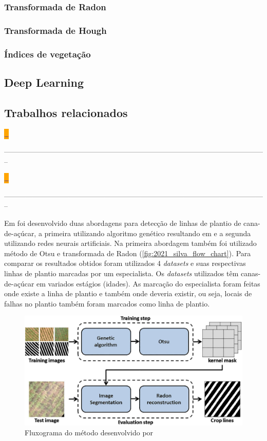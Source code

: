 \documentclass[12pt, a4paper, english, brazil]{article}
\newcommand{\dotsBlue}{\colorbox{orange}{\textcolor{blue}{\dots}}}
\newcommand{\linePage}{--------------------------------------------------------------------------------------------------------------}
\begin{document}
\subsubsection{Transformada de Radon}

\subsubsection{Transformada de Hough}

\subsubsection{Índices de vegetação}

\subsection{Deep Learning}

\subsection{Trabalhos relacionados}

\cite{Souza_2017} \dotsBlue

\linePage

\cite{Souza_2018} \dotsBlue

\linePage

Em  foi desenvolvido duas abordagens para detecção de linhas de plantio de cana-de-açúcar, a primeira utilizando algoritmo genético resultando em  e a segunda utilizando redes neurais artificiais. Na primeira abordagem também foi utilizado método de Otsu e transformada de Radon (\autoref{fig:2021_silva_flow_chart}). Para comparar os resultados obtidos foram utilizados 4 \textit{datasets} e suas respectivas linhas de plantio marcadas por um especialista. Os \textit{datasets} utilizados têm canas-de-açúcar em variados estágios (idades). As marcação do especialista foram feitas onde existe a linha de plantio e também onde deveria existir, ou seja, locais de falhas no plantio também foram marcados como linha de plantio.

\begin{figure}[htbp]
    \centering
    \includegraphics[width=0.6\textheight]{img/2021_Silva_flow_chart.png}
    \caption{Fluxograma do método desenvolvido por  }
    \label{fig:2021_silva_flow_chart}
\end{figure}
\end{document}
